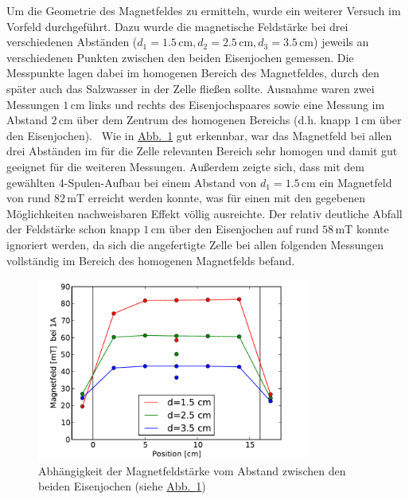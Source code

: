 \documentclass[11pt]{scrartcl}
\newcommand{\unit}[1]{\ensuremath{\,\mathrm{#1}}} %
\begin{document}
Um die Geometrie des Magnetfeldes zu ermitteln, wurde ein weiterer Versuch im Vorfeld durchgeführt. Dazu wurde die magnetische Feldstärke bei drei verschiedenen Abständen ($d_1=1.5 \unit{cm}, d_2=2.5 \unit{cm}, d_3=3.5 \unit{cm}$) jeweils an verschiedenen Punkten zwischen den beiden Eisenjochen gemessen. Die Messpunkte lagen dabei im homogenen Bereich des Magnetfeldes, durch den später auch das Salzwasser in der Zelle fließen sollte. Ausnahme waren zwei Messungen $1 \unit{cm}$ links und rechts des Eisenjochspaares sowie eine Messung im Abstand $2 \unit{cm}$ über dem Zentrum des homogenen Bereichs (d.h. knapp $1 \unit{cm}$ über den Eisenjochen). \
Wie in \hyperref[vormessung_magnetfeld]{Abb.~\ref{vormessung_magnetfeld}} gut erkennbar, war das Magnetfeld bei allen drei Abständen im für die Zelle relevanten Bereich sehr homogen und damit gut geeignet für die weiteren Messungen. Außerdem zeigte sich, dass mit dem gewählten 4-Spulen-Aufbau bei einem Abstand von $d_1=1.5 \unit{cm}$ ein Magnetfeld von rund $82 \unit{mT}$ erreicht werden konnte, was für einen mit den gegebenen Möglichkeiten nachweisbaren Effekt völlig ausreichte.
Der relativ deutliche Abfall der Feldstärke schon knapp $1 \unit{cm}$ über den Eisenjochen auf rund $58 \unit{mT}$ konnte ignoriert werden, da sich die angefertigte Zelle bei allen folgenden Messungen vollständig im Bereich des homogenen Magnetfelds befand. 

\begin{figure}[ht]
\begin{center}
\includegraphics[width=0.8\textwidth]{images/vormessung_magnetfeld.pdf}
\end{center}
\vspace{-1.5\baselineskip}
\caption{Abhängigkeit der Magnetfeldstärke vom Abstand zwischen den beiden Eisenjochen (siehe \hyperref[vormessung_magnetfeld]{Abb.~\ref{vormessung_magnetfeld}})}
\label{vormessung_magnetfeld}
\end{figure}
\end{document}
